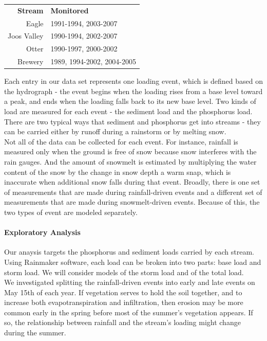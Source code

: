 \documentclass[12pt]{article}
\begin{document}
\begin{table}[h]
\begin{center}
\begin{tabular}{r l}
        \textbf{Stream} & \textbf{Monitored} \\
        Eagle & 1991-1994, 2003-2007\\
        Joos Valley & 1990-1994, 2002-2007\\
        Otter & 1990-1997, 2000-2002\\
        Brewery & 1989, 1994-2002, 2004-2005\\
    \end{tabular}
\end{center}
\end{table}

Each entry in our data set represents one loading event, which is defined based on the hydrograph - the event begins when the loading rises from a base level toward a peak, and ends when the loading falls back to its new base level. Two kinds of load are measured for each event - the sediment load and the phosphorus load. There are two typical ways that sediment and phosphorus get into streams - they can be carried either by runoff during a rainstorm or by melting snow.\\

Not all of the data can be collected for each event. For instance, rainfall is measured only when the ground is free of snow because snow interferes with the rain gauges. And the amount of snowmelt is estimated by multiplying the water content of the snow by the change in snow depth a warm snap, which is inaccurate when additional snow falls during that event. Broadly, there is one set of measurements that are made during rainfall-driven events and a different set of measurements that are made during snowmelt-driven events. Because of this, the two types of event are modeled separately.\\

\paragraph{Exploratory Analysis}
Our anaysis targets the phosphorus and sediment loads carried by each stream. Using Rainmaker software, each load can be broken into two parts: base load and storm load. We will consider models of the storm load and of the total load.\\

We investigated splitting the rainfall-driven events into early and late events on May 15th of each year. If vegetation serves to hold the soil together, and to increase both evapotranspiration and infiltration, then erosion may be more common early in the spring before most of the summer's vegetation appears. If so, the relationship between rainfall and the stream's loading might change during the summer.\\
\end{document}
